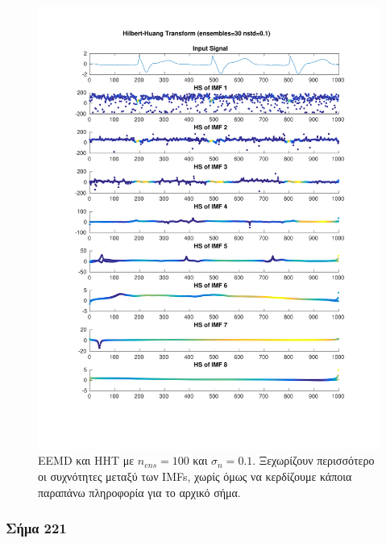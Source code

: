 \documentclass[11pt,a4paper]{article}
\begin{document}
\begin{figure}[H]
\begin{minipage}{0.48\textwidth}
	\includegraphics[width=\textwidth]{fig/217l1_hht_ensemble.pdf}
\end{minipage}
\vfill
\caption{EEMD και HHT με $n_{ens}=100$ και $\sigma_n = 0.1$. Ξεχωρίζουν περισσότερο οι συχνότητες μεταξύ των IMFs, χωρίς όμως να κερδίζουμε κάποια παραπάνω πληροφορία για το αρχικό σήμα.}
\label{fig:217l1_hht_ensemble}
\end{figure}

\subsubsection*{Σήμα 221}
\end{document}
